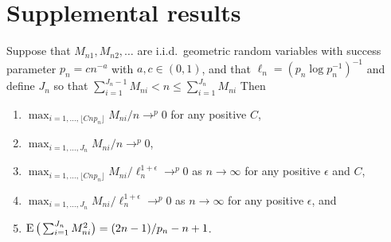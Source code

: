 \documentclass[11pt]{article}
\begin{document}
\section{Supplemental results}

\begin{lem}\label{L1}
  Suppose that $M_{n1}, M_{n2},\dots$ are i.i.d.\ geometric random
  variables with success parameter $p_n = c n^{-a}$ with $a, c \in
  (0,1)$, and that $\ell_n = (p_n \log p_n^{-1})^{-1}$ and define
  $J_n$ so that $\sum_{i=1}^{J_n-1} M_{ni} < n \leq \sum_{i=1}^{J_n} M_{ni} $
  Then
  \begin{enumerate}
  \item $\max_{i=1,\dots,\lfloor C n p_n \rfloor} M_{ni} / n \to^p 0$
    for any positive $C$,
  \item $\max_{i=1,\dots,J_n} M_{ni} / n \to^p 0$,
  \item $\max_{i=1,\dots,  \lfloor C n p_n \rfloor} M_{ni} /
  \ell_n^{1+\epsilon} \to^p 0$ as $n \to \infty$ for any positive
  $\epsilon$ and $C$,
  \item $\max_{i=1,\dots,J_n} M_{ni} /
  \ell_n^{1+\epsilon} \to^p 0$ as $n \to \infty$ for any positive
  $\epsilon$, and
  \item $\operatorname{E}\big(\sum_{i=1}^{J_n} M_{ni}^2\big) = (2 n - 1) / p_n - n + 1$.
  \end{enumerate}
\end{lem}
\end{document}
